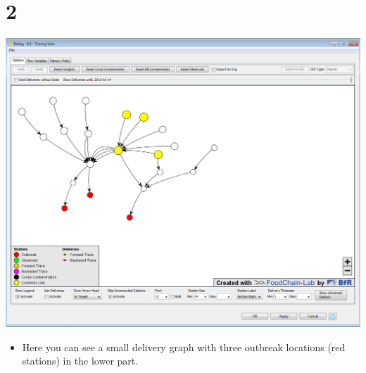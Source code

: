 \documentclass[10pt]{beamer}
\begin{document}
\section{2}
\begin{frame}
	\begin{center}
  		\includegraphics[height=0.6\textheight]{2.png}
	\end{center}
	\begin{itemize}
		\item Here you can see a small delivery graph with three outbreak locations (red stations) in the lower part.
	\end{itemize}
\end{frame}
\end{document}
